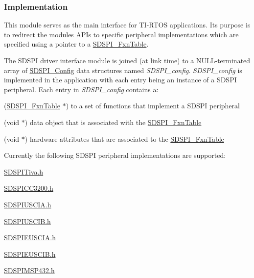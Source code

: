 \subsubsection*{Implementation}

This module serves as the main interface for T\+I-\/\+R\+T\+O\+S applications. Its purpose is to redirect the module\textquotesingle{}s A\+P\+Is to specific peripheral implementations which are specified using a pointer to a \hyperlink{struct_s_d_s_p_i___fxn_table}{S\+D\+S\+P\+I\+\_\+\+Fxn\+Table}.

The S\+D\+S\+P\+I driver interface module is joined (at link time) to a N\+U\+L\+L-\/terminated array of \hyperlink{struct_s_d_s_p_i___config}{S\+D\+S\+P\+I\+\_\+\+Config} data structures named {\itshape S\+D\+S\+P\+I\+\_\+config}. {\itshape S\+D\+S\+P\+I\+\_\+config} is implemented in the application with each entry being an instance of a S\+D\+S\+P\+I peripheral. Each entry in {\itshape S\+D\+S\+P\+I\+\_\+config} contains a\+:
\begin{DoxyItemize}
\item (\hyperlink{struct_s_d_s_p_i___fxn_table}{S\+D\+S\+P\+I\+\_\+\+Fxn\+Table} $\ast$) to a set of functions that implement a S\+D\+S\+P\+I peripheral
\item (void $\ast$) data object that is associated with the \hyperlink{struct_s_d_s_p_i___fxn_table}{S\+D\+S\+P\+I\+\_\+\+Fxn\+Table}
\item (void $\ast$) hardware attributes that are associated to the \hyperlink{struct_s_d_s_p_i___fxn_table}{S\+D\+S\+P\+I\+\_\+\+Fxn\+Table}
\end{DoxyItemize}

Currently the following S\+D\+S\+P\+I peripheral implementations are supported\+:
\begin{DoxyItemize}
\item \hyperlink{_s_d_s_p_i_tiva_8h}{S\+D\+S\+P\+I\+Tiva.\+h}
\item \hyperlink{_s_d_s_p_i_c_c3200_8h}{S\+D\+S\+P\+I\+C\+C3200.\+h}
\item \hyperlink{_s_d_s_p_i_u_s_c_i_a_8h}{S\+D\+S\+P\+I\+U\+S\+C\+I\+A.\+h}
\item \hyperlink{_s_d_s_p_i_u_s_c_i_b_8h}{S\+D\+S\+P\+I\+U\+S\+C\+I\+B.\+h}
\item \hyperlink{_s_d_s_p_i_e_u_s_c_i_a_8h}{S\+D\+S\+P\+I\+E\+U\+S\+C\+I\+A.\+h}
\item \hyperlink{_s_d_s_p_i_e_u_s_c_i_b_8h}{S\+D\+S\+P\+I\+E\+U\+S\+C\+I\+B.\+h}
\item \hyperlink{_s_d_s_p_i_m_s_p432_8h}{S\+D\+S\+P\+I\+M\+S\+P432.\+h}
\end{DoxyItemize}

